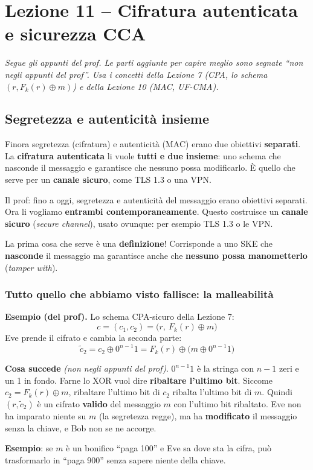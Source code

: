 \chapter{Lezione 11 -- Cifratura autenticata e sicurezza CCA}

\emph{Segue gli appunti del prof. Le parti aggiunte per capire meglio sono segnate ``non negli appunti del prof''. Usa i concetti della Lezione 7 (CPA, lo schema \((r, F_k(r) \oplus m)\)) e della Lezione 10 (MAC, UF-CMA).}

\section{Segretezza e autenticità insieme}

\begin{inbreve}
Finora segretezza (cifratura) e autenticità (MAC) erano due obiettivi \textbf{separati}. La \textbf{cifratura autenticata} li vuole \textbf{tutti e due insieme}: uno schema che nasconde il messaggio e garantisce che nessuno possa modificarlo. È quello che serve per un \textbf{canale sicuro}, come TLS 1.3 o una VPN.
\end{inbreve}

Il prof: fino a oggi, segretezza e autenticità del messaggio erano obiettivi separati. Ora li vogliamo \textbf{entrambi contemporaneamente}. Questo costruisce un \textbf{canale sicuro} (\emph{secure channel}), usato ovunque: per esempio TLS 1.3 o le VPN.

La prima cosa che serve è una \textbf{definizione}! Corrisponde a uno SKE che \textbf{nasconde} il messaggio ma garantisce anche che \textbf{nessuno possa manometterlo} (\emph{tamper with}).

\subsection{Tutto quello che abbiamo visto fallisce: la malleabilità}

\textbf{Esempio (del prof).} Lo schema CPA-sicuro della Lezione 7:
\[
c = (c_1, c_2) = \big(r,\ F_k(r) \oplus m\big)
\]
Eve prende il cifrato e cambia la seconda parte:
\[
\tilde{c}_2 = c_2 \oplus 0^{n-1}1 = F_k(r) \oplus \big(m \oplus 0^{n-1}1\big)
\]

\begin{nota}
\textbf{Cosa succede} \emph{(non negli appunti del prof)}. \(0^{n-1}1\) è la stringa con \(n-1\) zeri e un 1 in fondo. Farne lo XOR vuol dire \textbf{ribaltare l'ultimo bit}. Siccome \(c_2 = F_k(r) \oplus m\), ribaltare l'ultimo bit di \(c_2\) ribalta l'ultimo bit di \(m\). Quindi \((r, \tilde{c}_2)\) è un cifrato \textbf{valido} del messaggio \(m\) con l'ultimo bit ribaltato. Eve non ha imparato niente su \(m\) (la segretezza regge), ma ha \textbf{modificato} il messaggio senza la chiave, e Bob non se ne accorge.

\textbf{Esempio}: se \(m\) è un bonifico ``paga 100'' e Eve sa dove sta la cifra, può trasformarlo in ``paga 900'' senza sapere niente della chiave.
\end{nota}

